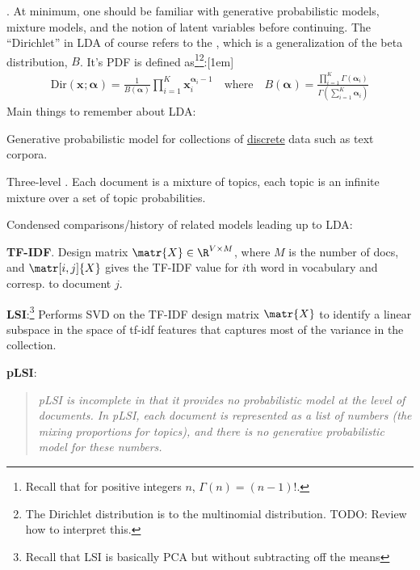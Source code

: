 \documentclass[11pt]{article}
\renewcommand\vec[2][]{\bm{#2}_{#1}}
\newcommand\myspace[1][]{\vspace{#1\bigskipamount}}
\newcommand\p{\Needspace{10\baselineskip} \noindent}
\begin{document}
\myspace
\p {}. At minimum, one should be familiar with generative probabilistic models, mixture models, and the notion of latent variables before continuing. The ``Dirichlet'' in LDA of course refers to the , which is a generalization of the beta distribution, $B$. It's PDF is defined as\footnote{
	Recall that for positive integers $n$, $\Gamma(n) = (n - 1)!$.
	}\footnote{The Dirichlet distribution is  to the multinomial distribution. TODO: Review how to interpret this.}:\marginnote{$$\sum_{i=1}^{K} \vec[i]{x} = 1$$  $$(\forall i \in [1,K]):\vec[i]{x} \ge 0$$}[1em]
	\begin{align}
		\text{Dir}(\vec{x}; \vec{\alpha}) = \frac{1}{B(\vec{\alpha})} \prod_{i=1}^{K} \vec[i]{x}^{\vec[i]{\alpha} - 1} 
		\quad \text{where} \quad
		B(\vec{\alpha}) = \frac{ \prod_{i=1}^{K} \Gamma\left( \vec[i]{\alpha}\right) }{  \Gamma(\sum_{i=1}^{K} \vec[i]{\alpha}) }
		\label{dirichlet}
	\end{align}
Main things to remember about LDA:
\begin{compactitem}[-]
	\item Generative probabilistic model for collections of \underline{discrete} data such as text corpora.
	\item Three-level . Each document is a mixture of topics, each topic is an infinite mixture over a set of topic probabilities.
\end{compactitem}
Condensed comparisons/history of related models leading up to LDA:
\begin{compactitem}[-]
	\item \textbf{TF-IDF}. Design matrix $\matr{X} \in \R^{V \times M}$, where $M$ is the number of docs, and $\matr[i,j]{X}$ gives the TF-IDF value for $i$th word in vocabulary and corresp. to document $j$. 
	
	\item \textbf{LSI}:\footnote{Recall that LSI is basically PCA but without subtracting off the means} Performs SVD on the TF-IDF design matrix $\matr{X}$ to identify a linear subspace in the space of tf-idf features that captures most of the variance in the collection.
	
	\item \textbf{pLSI}: 
\end{compactitem}
\vspace{-1em}
\begin{quote}
	{\small \textit{pLSI is incomplete
			in that it provides no probabilistic model at the level of documents. In pLSI, each document is
			represented as a list of numbers (the mixing proportions for topics), and there is no generative
			probabilistic model for these numbers.}}
\end{quote}
\end{document}
